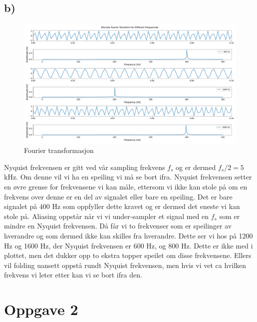 \documentclass{article}
\begin{document}
\subsection*{b)}
\begin{figure}[h!]
  \centering
  \includegraphics[width = \textwidth]{fig/1.b.pdf}
  \caption{Fourier transformasjon}
  \label{fig: 1.b}
\end{figure}
Nyquist frekvensen er gitt ved vår sampling frekvens $f_s$ og er dermed $f_s / 2 = 5$
kHz. Om denne vil vi ha en speiling vi må se bort ifra. Nyquist frekvensen setter en øvre grense for frekvensene vi kan måle, ettersom vi ikke kan stole på om en frekvens over denne er en del av signalet eller bare en speiling. Det er bare signalet på $400$ Hz som oppfyller dette kravet og er dermed det eneste vi kan stole på. Aliasing oppstår når vi vi under-sampler et signal med en $f_s$ som er mindre en Nyquist frekvensen. Då får vi to frekvenser som er speilinger av hverandre og som dermed ikke kan skilles fra hverandre. Dette ser vi hos på 1200 Hz og 1600 Hz, der Nyquist frekvensen er 600 Hz, og 800 Hz. Dette er ikke med i plottet, men det dukker opp to ekstra topper speilet om disse frekvensene. Ellers vil folding uansett oppstå rundt Nyquist frekvensen, men hvis vi vet ca hvilken frekvens vi leter etter kan vi se bort ifra den. 

\section*{Oppgave 2}
\end{document}
